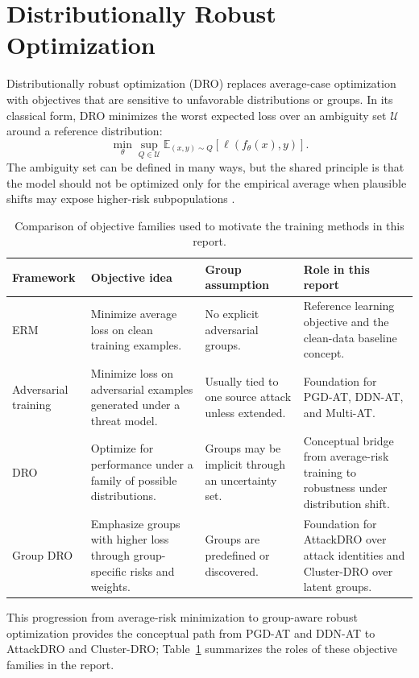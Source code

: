 \section{Distributionally Robust Optimization}

Distributionally robust optimization (DRO) replaces average-case optimization with objectives that are sensitive to unfavorable distributions or groups. In its classical form, DRO minimizes the worst expected loss over an ambiguity set $\mathcal{U}$ around a reference distribution:
\[
\min_{\theta}
\sup_{Q\in\mathcal{U}}
\mathbb{E}_{(x,y)\sim Q}
\left[\ell(f_\theta(x),y)\right].
\]
The ambiguity set can be defined in many ways, but the shared principle is that the model should not be optimized only for the empirical average when plausible shifts may expose higher-risk subpopulations \cite{hashimoto2018fairness,duchi2021learning}.


\begin{table}[H]
\centering
\caption[Objective family comparison]{Comparison of objective families used to motivate the training methods in this report.}
\label{tab:ch2_objective_families}
\small
\setlength{\tabcolsep}{3pt}
\begin{tabularx}{\linewidth}{@{}l>{\raggedright\arraybackslash}X>{\raggedright\arraybackslash}X>{\raggedright\arraybackslash}X@{}}
\toprule
Framework & Objective idea & Group assumption & Role in this report \\
\midrule
ERM &
Minimize average loss on clean training examples. &
No explicit adversarial groups. &
Reference learning objective and the clean-data baseline concept. \\
Adversarial training &
Minimize loss on adversarial examples generated under a threat model. &
Usually tied to one source attack unless extended. &
Foundation for PGD-AT, DDN-AT, and Multi-AT. \\
DRO &
Optimize for performance under a family of possible distributions. &
Groups may be implicit through an uncertainty set. &
Conceptual bridge from average-risk training to robustness under distribution shift. \\
Group DRO &
Emphasize groups with higher loss through group-specific risks and weights. &
Groups are predefined or discovered. &
Foundation for AttackDRO over attack identities and Cluster-DRO over latent groups. \\
\bottomrule
\end{tabularx}
\end{table}
This progression from average-risk minimization to group-aware robust optimization provides the conceptual path from PGD-AT and DDN-AT to AttackDRO and Cluster-DRO; Table~\ref{tab:ch2_objective_families} summarizes the roles of these objective families in the report.

